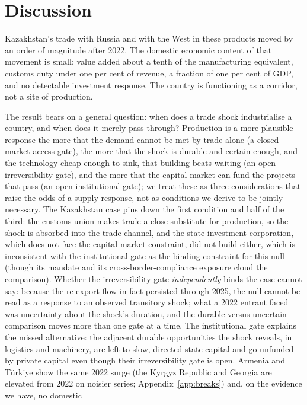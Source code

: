 \documentclass[12pt]{article}
\begin{document}
\section{Discussion}\label{sec:discussion}

Kazakhstan's trade with Russia and with the West in these products moved by an order of
magnitude after 2022. The domestic economic content of that movement is small: value added
about a tenth of the manufacturing equivalent, customs duty under one per cent of revenue, a
fraction of one per cent of GDP, and no detectable investment response. The country is
functioning as a corridor, not a site of production.

The result bears on a general question: when does a trade shock industrialise a country, and
when does it merely pass through? Production is a more plausible response the more that the
demand cannot be met by trade alone (a closed market-access gate), the more that the shock is
durable and certain enough, and the technology cheap enough to sink, that building beats
waiting (an open irreversibility gate), and the more that the capital market can fund the
projects that pass (an open institutional gate); we treat these as three considerations that
raise the odds of a supply response, not as conditions we derive to be jointly necessary. The
Kazakhstan case pins down the first
condition and half of the third: the customs union makes trade a close substitute
for production, so the shock is absorbed into the trade channel, and the state investment
corporation, which does not face the capital-market constraint, did not build either, which
is inconsistent with the institutional gate as the binding constraint for this null (though its mandate
and its cross-border-compliance exposure cloud the comparison). Whether the irreversibility
gate \emph{independently} binds the case cannot say: because the re-export flow in fact
persisted through 2025, the null cannot be read as a response to an observed transitory shock;
what a 2022 entrant faced was uncertainty about the shock's duration, and the
durable-versus-uncertain comparison moves more than one gate at a time. The
institutional gate explains the missed alternative: the adjacent durable opportunities the
shock reveals, in logistics and machinery, are left to slow, directed
state capital and go unfunded by private capital even though their irreversibility gate is
open. Armenia and T\"urkiye show the same 2022 surge (the Kyrgyz Republic and Georgia are
elevated from 2022 on noisier series; Appendix~\ref{app:breaks}) and, on the evidence we have, no domestic
\end{document}
